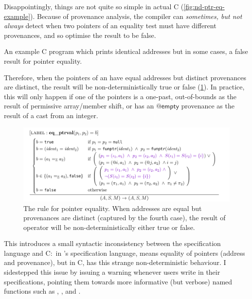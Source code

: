 Disappointingly, things are not quite so simple in actual C
(\cref{fig:nd-ptr-eq-example}). Because of provenance analysis, the compiler can
\emph{sometimes, but not always} detect when two pointers of an
equality test must have different provenances, and so optimise the result to be
false.

\begin{marginfigure}
    \caption{An example C program which prints identical addresses but
        in some cases, a false result for pointer equality.}\label{fig:nd-ptr-eq-example}
\end{marginfigure}

Therefore, when the pointers of an \cinline{==} have equal
addresses but distinct provenances are distinct, the result will be
non-deterministically true or false (\cref{fig:nd-ptr-eq}). In practice, this will
only happen if one of the pointers is a one-past, out-of-bounds as
the result of permissive array/member shift, or has an $@\mathsf{empty}$
provenance as the result of a cast from an integer.

\begin{figure}
    \includegraphics{figures/mem-model-pnvi-nd-ptr-eq}
    \caption{The  rule for pointer equality. When addresses
        are equal but provenances are distinct (captured by the fourth case),
        the result of \cinline{==} operator will be non-deterministically either
        true or false.}\label{fig:nd-ptr-eq}
\end{figure}

This introduces a small syntactic inconsistency between the specification
language and C:\ in 's specification language, \cninline{==} means
equality of pointers (address and provenance), but in C, \cinline{==} has
this strange non-deterministic behaviour. I sidestepped this issue by issuing a
warning whenever users write \cninline{==} in their specifications, pointing
them towards more informative (but verbose) named functions such as
, , and .

